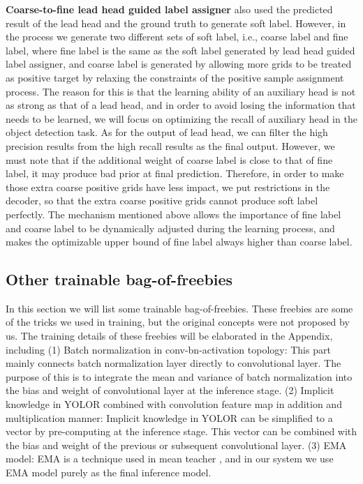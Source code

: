 \documentclass[10pt,twocolumn,letterpaper]{article}
\begin{document}
		\textbf{Coarse-to-fine lead head guided label assigner} also used the predicted result of the lead head and the ground truth  to generate soft label.  However, in the process we generate two different sets of soft label, i.e., coarse label and fine label, where fine label is the same as the soft label generated by lead head guided label assigner, and coarse label is generated by allowing more grids to be treated as positive target by relaxing the constraints of the positive sample assignment process.  The reason for this is that the learning ability of an auxiliary head is not as strong as that of a lead head, and in order to avoid losing the information that needs to be learned, we will focus on optimizing the recall of auxiliary head in the object detection task.  As for the output of lead head, we can filter the high precision results from the high recall results as the final output.  However, we must note that if the additional weight of coarse label is close to that of fine label, it may produce bad prior at final prediction.  Therefore, in order to make those extra coarse positive grids have less impact, we put restrictions in the decoder, so that the extra coarse positive grids cannot produce soft label perfectly.  The mechanism mentioned above allows the importance of fine label and coarse label to be dynamically adjusted during the learning process, and makes the optimizable upper bound of fine label always higher than coarse label.	
		
		\subsection{Other trainable bag-of-freebies}
		
		In this section we will list some trainable bag-of-freebies.  These freebies are some of the tricks we used in training, but the original concepts were not proposed by us.  The training details of these freebies will be elaborated in the Appendix, including (1) Batch normalization in conv-bn-activation topology: This part mainly connects batch normalization layer directly to convolutional layer.  The purpose of this is to integrate the mean and variance of batch normalization into the bias and weight of convolutional layer at the inference stage. (2) Implicit knowledge in YOLOR \cite{wang2021you} combined with convolution feature map in addition and multiplication manner: Implicit knowledge in YOLOR can be simplified to a vector by pre-computing at the inference stage.  This vector can be combined with the bias and weight of the previous or subsequent convolutional layer. (3) EMA model: EMA is a technique used in mean teacher \cite{tarvainen2017mean}, and in our system we use EMA model purely as the final inference model.
		
\end{document}
